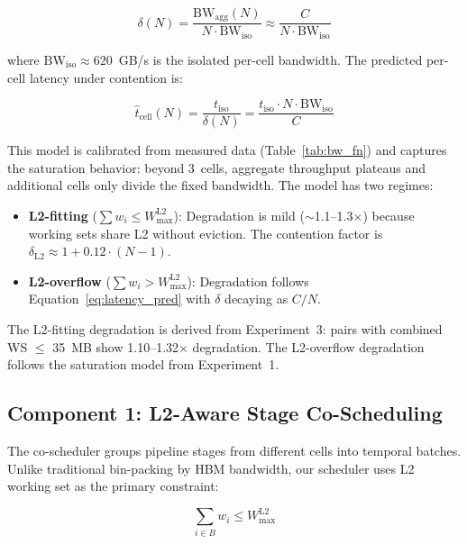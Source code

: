 \begin{equation}
\delta(N) = \frac{\text{BW}_{\text{agg}}(N)}{N \cdot \text{BW}_{\text{iso}}} \approx \frac{C}{N \cdot \text{BW}_{\text{iso}}}
\label{eq:delta}
\end{equation}

where $\text{BW}_{\text{iso}} \approx 620$~GB/s is the isolated per-cell bandwidth. The predicted per-cell latency under contention is:

\begin{equation}
\hat{t}_{\text{cell}}(N) = \frac{t_{\text{iso}}}{\delta(N)} = \frac{t_{\text{iso}} \cdot N \cdot \text{BW}_{\text{iso}}}{C}
\label{eq:latency_pred}
\end{equation}

This model is calibrated from measured data (Table~\ref{tab:bw_fn}) and captures the saturation behavior: beyond 3~cells, aggregate throughput plateaus and additional cells only divide the fixed bandwidth. The model has two regimes:

\begin{itemize}[leftmargin=*,nosep]
\item \textbf{L2-fitting} ($\sum w_i \leq W^{\text{L2}}_{\text{max}}$): Degradation is mild ($\sim$1.1--1.3$\times$) because working sets share L2 without eviction. The contention factor is $\delta_{\text{L2}} \approx 1 + 0.12 \cdot (N-1)$.
\item \textbf{L2-overflow} ($\sum w_i > W^{\text{L2}}_{\text{max}}$): Degradation follows Equation~\ref{eq:latency_pred} with $\delta$ decaying as $C/N$.
\end{itemize}

The L2-fitting degradation is derived from Experiment~3: pairs with combined WS $\leq$ 35~MB show 1.10--1.32$\times$ degradation. The L2-overflow degradation follows the saturation model from Experiment~1.

\subsection{Component 1: L2-Aware Stage Co-Scheduling}
\label{sec:cosched}

The co-scheduler groups pipeline stages from different cells into temporal batches. Unlike traditional bin-packing by HBM bandwidth, our scheduler uses L2 working set as the primary constraint:

\begin{equation}
\sum_{i \in B} w_i \leq W^{\text{L2}}_{\text{max}}
\label{eq:l2_constraint}
\end{equation}

